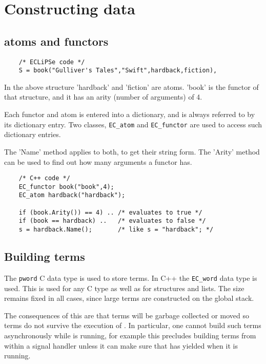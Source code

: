 \section{Constructing {\eclipse} data}
\subsection{{\eclipse} atoms and functors}

\begin{verbatim}
    /* ECLiPSe code */
    S = book("Gulliver's Tales","Swift",hardback,fiction),
\end{verbatim}

In the above structure 'hardback' and 'fiction' are atoms. 'book'
is the functor of that structure, and it has an arity (number
of arguments) of 4.

Each functor and atom is entered into a dictionary, and is always
referred to by its dictionary entry. Two classes, \verb.EC_atom.
and \verb.EC_functor. are used to access such dictionary entries.

The 'Name' method applies to both, to get their string form.
The 'Arity' method can be used to find out how many arguments
a functor has.

\begin{verbatim}
    /* C++ code */
    EC_functor book("book",4);
    EC_atom hardback("hardback");

    if (book.Arity()) == 4) .. /* evaluates to true */
    if (book == hardback) ..   /* evaluates to false */
    s = hardback.Name();       /* like s = "hardback"; */
\end{verbatim}


\subsection{Building {\eclipse} terms}

The \verb.pword. C data type is used to store {\eclipse} terms. In C++ the
\verb.EC_word. data type is used. This is used for any C type as well
as for {\eclipse} structures and lists. The size remains fixed in all
cases, since large terms are constructed on the {\eclipse} global stack.

The consequences of this are that terms will be garbage collected
or moved so terms do not survive the execution of {\eclipse}. In
particular, one cannot build such terms asynchronously while
{\eclipse} is running, for example this precludes building terms from
within a signal handler unless it can make sure that {\eclipse} has
yielded when it is running.

